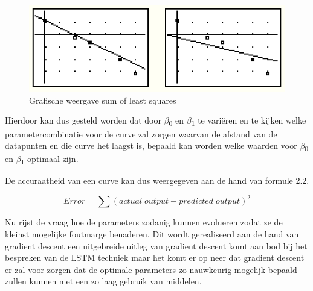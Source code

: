 \begin{figure}[!h]
    \centering
    \caption{Grafische weergave sum of least squares~\autocite{Brown2020}}
    \label{fig:least_squares}
    \includegraphics[width=0.7\linewidth]{least_squares}
\end{figure}

Hierdoor kan dus gesteld worden dat door $\beta$\textsubscript{0} en $\beta$\textsubscript{1} te vari\"{e}ren en te kijken welke parametercombinatie voor de curve zal zorgen waarvan de afstand van de datapunten en die curve het laagst is, bepaald kan worden welke waarden voor  $\beta$\textsubscript{0} en $\beta$\textsubscript{1} optimaal zijn.

De accuraatheid van een curve kan dus weergegeven aan de hand van formule 2.2.

\begin{equation}
Error = \sum(actual\;output - predicted\;output)^2
\end{equation}

Nu rijst de vraag hoe de parameters zodanig kunnen evolueren zodat ze de kleinst mogelijke foutmarge benaderen. Dit wordt gerealiseerd aan de hand van gradient descent een uitgebreide uitleg van gradient descent komt aan bod bij het bespreken van de LSTM techniek maar het komt er op neer dat gradient descent er zal voor zorgen dat de optimale parameters zo nauwkeurig mogelijk bepaald zullen kunnen met een zo laag gebruik van middelen.




